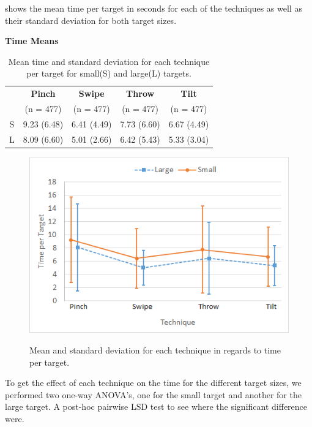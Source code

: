  shows the mean time per target in seconds for each of the techniques as well as their standard deviation for both target sizes. 
\begin{table}[H]
	\centering
	\textbf{Time Means}\\[4pt]
	\begin{adjustbox}{width=\columnwidth}
	\begin{tabular}{|c|c|c|c|c|}
		\hline
		\rowcolor[HTML]{9B9B9B} 
		 & \textbf{Pinch} & \textbf{Swipe} & \textbf{Throw} & \textbf{Tilt} \\ 
		 \rowcolor[HTML]{9B9B9B} 
		 & (n = 477) & (n = 477) & (n = 477) & (n = 477) \\ \hline
		S & 9.23 (6.48)          & 6.41  (4.49)         & 7.73 (6.60)          & 6.67 (4.49)  \\ \hline
		L & 8.09 (6.60)          & 5.01  (2.66)          & 6.42 (5.43)          & 5.33 (3.04) \\ \hline
	\end{tabular}
	\end{adjustbox}
	\caption{Mean time and standard deviation for each technique per target for small(S) and large(L) targets.}
	\label{tab:meanTimesTechnique}
\end{table}

\begin{figure}[H]
	{\includegraphics[width = 1\columnwidth ]{images/time.png}} 
	\caption{
		Mean and standard deviation for each technique in regards to time per target.
	}
	\label{fig:timeResults}
\end{figure}

To get the effect of each technique on the time for the different target sizes, we performed two one-way ANOVA's, one for the small target and another for the large target.
A post-hoc pairwise LSD test to see where the significant difference were.

